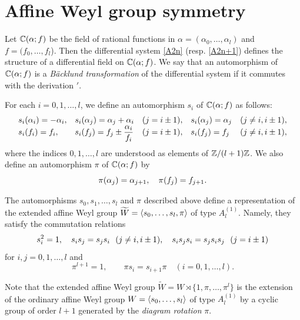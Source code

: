 \section{Affine Weyl group symmetry} 
Let ${\Bbb C}(\alpha;f)$ be the field of rational functions in 
$\alpha=(\alpha_0,\ldots,\alpha_l)$ and $f=(f_0,\ldots,f_l$).  
Then the differential system \eqref{A2n} (resp. \eqref{A2n+1}) 
defines the structure of a differential field on ${\Bbb C}(\alpha;f)$. 
We say that an automorphism of ${\Bbb C}(\alpha;f)$ is a 
{\em B\"acklund transformation} of the differential system 
if it commutes with the derivation $'$.  

For each $i=0,1,\ldots,l$, we define an automorphism $s_i$ of ${\Bbb C}(\alpha;f)$
as follows:
\begin{equation}\Label{WAl1}
\begin{array}{lllll}
s_i(\alpha_i)=-\alpha_i, 
&s_i(\alpha_{j})=\alpha_j+\alpha_i&(j=i\pm 1),
&s_i(\alpha_{j})=\alpha_j&(j\ne i,i\pm1 ), \\
s_i(f_i)=f_i,
&s_i(f_j)=\displaystyle{f_j\pm\frac{\alpha_i}{f_i}}&(j=i\pm 1),
&s_i(f_j)=f_j&(j\ne i,i\pm1),
\end{array}
\end{equation}
where the indices $0,1,\ldots,l$ are understood as elements of ${\Bbb Z}/(l+1){\Bbb Z}$. 
We also define an automorphism $\pi$ of ${\Bbb C}(\alpha;f)$ by 
\begin{equation}\Label{WAl2}
\pi(\alpha_j)=\alpha_{j+1},\quad \pi(f_j)=f_{j+1}.
\end{equation}

\begin{thm}[\cite{NY3}]
The automorphisms $s_0,s_1,\ldots,s_l$ and $\pi$ described above define 
a representation of the extended affine Weyl group 
$\widetilde{W}=\langle s_0,\ldots,s_l,\pi \rangle$ of type $A^{(1)}_{l}$. 
Namely, they satisfy the commutation relations
\begin{equation}\Label{rel-s}
s_i^2=1, \quad s_is_j=s_js_i\ \ (j\ne i,i\pm1),\quad
s_is_js_i=s_js_is_j \ \ (j=i\pm1)
\end{equation}
for $i,j=0,1,\ldots,l$ and 
\begin{equation}
\pi^{l+1}=1,\qquad \pi s_{i}=s_{i+1} \pi\quad(i=0,1,\ldots,l).
\end{equation}
\end{thm}
\noindent
Note that the extended affine Weyl group 
$\widetilde{W}=W\rtimes\{1,\pi,\ldots,\pi^l\}$ is the extension of 
the ordinary affine Weyl group $W=\langle s_0,\ldots,s_l \rangle$ of type $A^{(1)}_l$ 
by a cyclic group of order $l+1$ generated by the {\em diagram rotation} $\pi$.


